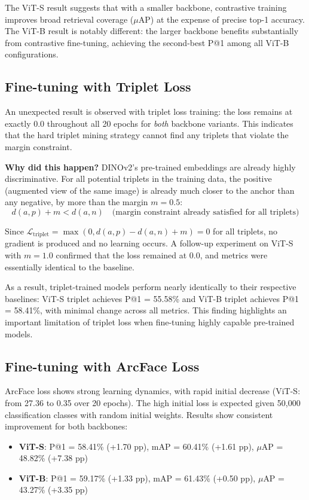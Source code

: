 \documentclass[
    english,
]{VUMIFPSbakalaurinis}
\begin{document}
The ViT-S result suggests that with a smaller backbone, contrastive training improves broad retrieval coverage ($\mu$AP) at the expense of precise top-1 accuracy. The ViT-B result is notably different: the larger backbone benefits substantially from contrastive fine-tuning, achieving the second-best P@1 among all ViT-B configurations.

\subsection{Fine-tuning with Triplet Loss}
\label{sec:triplet_analysis}

An unexpected result is observed with triplet loss training: the loss remains at exactly 0.0 throughout all 20 epochs for \textit{both} backbone variants. This indicates that the hard triplet mining strategy cannot find any triplets that violate the margin constraint.

\textbf{Why did this happen?} DINOv2's pre-trained embeddings are already highly discriminative. For all potential triplets in the training data, the positive (augmented view of the same image) is already much closer to the anchor than any negative, by more than the margin $m = 0.5$:
\begin{equation}
d(a, p) + m < d(a, n) \quad \text{(margin constraint already satisfied for all triplets)}
\end{equation}

Since $\mathcal{L}_{\text{triplet}} = \max(0, d(a,p) - d(a,n) + m) = 0$ for all triplets, no gradient is produced and no learning occurs. A follow-up experiment on ViT-S with $m = 1.0$ confirmed that the loss remained at 0.0, and metrics were essentially identical to the baseline.

As a result, triplet-trained models perform nearly identically to their respective baselines: ViT-S triplet achieves P@1 = 55.58\% and ViT-B triplet achieves P@1 = 58.41\%, with minimal change across all metrics. This finding highlights an important limitation of triplet loss when fine-tuning highly capable pre-trained models.

\subsection{Fine-tuning with ArcFace Loss}

ArcFace loss shows strong learning dynamics, with rapid initial decrease (ViT-S: from 27.36 to 0.35 over 20 epochs). The high initial loss is expected given 50,000 classification classes with random initial weights. Results show consistent improvement for both backbones:
\begin{itemize}
    \item \textbf{ViT-S}: P@1 = 58.41\% (+1.70 pp), mAP = 60.41\% (+1.61 pp), $\mu$AP = 48.82\% (+7.38 pp)
    \item \textbf{ViT-B}: P@1 = 59.17\% (+1.33 pp), mAP = 61.43\% (+0.50 pp), $\mu$AP = 43.27\% (+3.35 pp)
\end{itemize}
\end{document}
